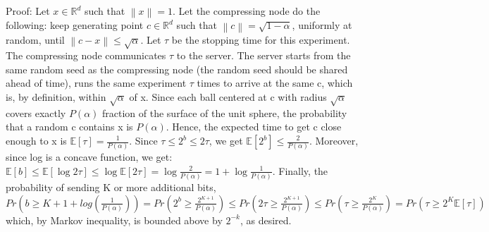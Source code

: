 \documentclass{article}
\newcommand{\norm}[1]{\left\| #1 \right\|}
\newcommand{\Exp}[1]{{\mathbb E}\left[#1\right]}
\newcommand{\R}{\mathbb{R}^d}
\begin{document}
Proof: Let $x \in \R$ such that $\norm{x}=1$. Let the compressing node do the following: keep generating point $c \in \R$ such that $\norm{c}=\sqrt{1-\alpha}$, uniformly at random, until $\norm{c-x} \le \sqrt{\alpha}$. Let $\tau$ be the stopping time for this experiment. The compressing node communicates $\tau$ to the server. The server starts from the same random seed as the compressing node (the random seed should be shared ahead of time), runs the same experiment $\tau$ times to arrive at the same c, which is, by definition, within $\sqrt{\alpha}$ of x. Since each ball centered at c with radius $\sqrt{\alpha}$ covers exactly $P(\alpha)$ fraction of the surface of the unit sphere, the probability that a random c contains x is $P(\alpha)$. Hence, the expected time to get c close enough to x is $\Exp{\tau}=\frac{1}{P(\alpha)}$. Since $\tau \le 2^b \le 2\tau$, we get $\Exp{2^b} \le \frac{2}{P(\alpha)}$. Moreover, since log is a concave function, we get: $\Exp{b} \le \Exp{\log{2\tau}} \le \log{\Exp{2\tau}} = \log{\frac{2}{P(\alpha)}} = 1+\log{\frac{1}{P(\alpha)}}$. Finally, the probability of sending K or more additional bits, $Pr(b \ge K + 1 + log(\frac{1}{P(\alpha)})) = Pr(2^b \ge \frac{2^{K+1}}{P(\alpha)}) \le Pr(2\tau \ge \frac{2^{K+1}}{P(\alpha)}) \le Pr(\tau \ge \frac{2^{K}}{P(\alpha)}) = Pr(\tau \ge 2^{K}\Exp{\tau})$ which, by Markov inequality, is bounded above by $2^{-k}$, as desired. 
\end{document}
